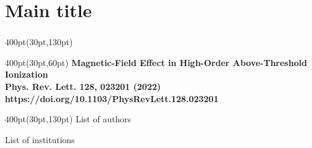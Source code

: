 \section{Main title}

\begin{frame}
\frametitle{}
\framesubtitle{}

\begin{textblock*}{400pt}(30pt,130pt)
\centering\footnotesize
\small
\begin{textblock*}{400pt}(30pt,60pt)
\bfseries\Large\centering
Magnetic-Field Effect in High-Order Above-Threshold Ionization \\
\vspace{5pt}
\small Phys. Rev. Lett. 128, 023201 (2022) \\
\Tiny https://doi.org/10.1103/PhysRevLett.128.023201
\end{textblock*}


\end{textblock*}


\begin{textblock*}{400pt}(30pt,130pt)
\centering\footnotesize
List of authors

\vspace{10pt}\tiny
List of institutions
\end{textblock*}

\end{frame}



